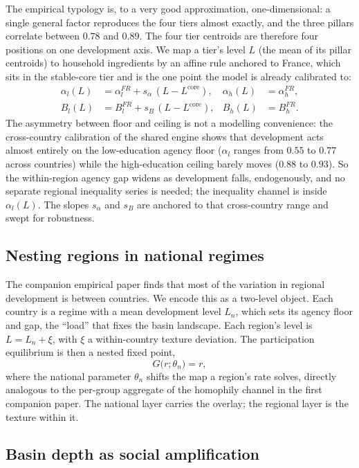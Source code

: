 \documentclass[11pt]{article}
\begin{document}
The empirical typology is, to a very good approximation, one-dimensional: a
single general factor reproduces the four tiers almost exactly, and the
three pillars correlate between $0.78$ and $0.89$. The four tier centroids
are therefore four positions on one development axis. We map a tier's level
$L$ (the mean of its pillar centroids) to household ingredients by an affine
rule anchored to France, which sits in the stable-core tier and is the one
point the model is already calibrated to:
\begin{align}
\alpha_l(L) &= \alpha_l^{FR} + s_\alpha\,(L - L^{\text{core}}), &
\alpha_h(L) &= \alpha_h^{FR}, \\
B_l(L) &= B_l^{FR} + s_B\,(L - L^{\text{core}}), &
B_h(L) &= B_h^{FR}.
\end{align}
The asymmetry between floor and ceiling is not a modelling convenience: the
cross-country calibration of the shared engine shows that development acts
almost entirely on the low-education agency floor ($\alpha_l$ ranges from
$0.55$ to $0.77$ across countries) while the high-education ceiling barely
moves ($0.88$ to $0.93$). So the within-region agency gap widens as
development falls, endogenously, and no separate regional inequality series
is needed; the inequality channel is inside $\alpha_l(L)$. The slopes
$s_\alpha$ and $s_B$ are anchored to that cross-country range and swept for
robustness.

\subsection{Nesting regions in national regimes}

The companion empirical paper finds that most of the variation in regional
development is between countries. We encode this as a two-level object. Each
country is a regime with a mean development level $L_n$, which sets its
agency floor and gap, the ``load'' that fixes the basin landscape. Each
region's level is $L = L_n + \xi$, with $\xi$ a within-country texture
deviation. The participation equilibrium is then a nested fixed point,
\begin{equation}
G\bigl(r ; \theta_n\bigr) = r,
\end{equation}
where the national parameter $\theta_n$ shifts the map a region's rate
solves, directly analogous to the per-group aggregate of the homophily
channel in the first companion paper. The national layer carries the
overlay; the regional layer is the texture within it.

\subsection{Basin depth as social amplification}
\end{document}

